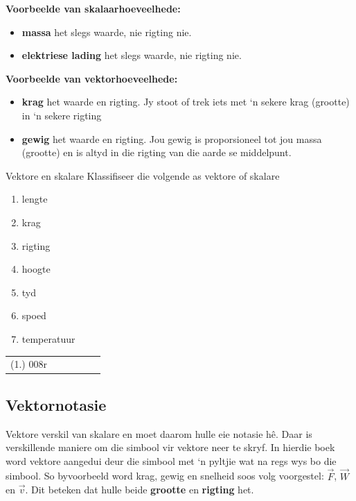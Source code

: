 \textbf{Voorbeelde van skalaarhoeveelhede:}
\begin{itemize}
\item \textbf{massa} het slegs waarde, nie rigting nie.
\item \textbf{elektriese lading} het slegs waarde, nie rigting nie.
\end{itemize}

\textbf{Voorbeelde van vektorhoeveelhede:} 
\begin{itemize}
\item \textbf{krag} het waarde en rigting. Jy stoot of trek iets met ‘n sekere krag (grootte) in ‘n sekere rigting
\item \textbf{gewig} het waarde en rigting. Jou gewig is proporsioneel tot jou massa (grootte) en is altyd in die rigting van die aarde se middelpunt.
\end{itemize}

\begin{exercises}{Vektore en skalare}\vspace{-1cm}
Klassifiseer die volgende as vektore of skalare
 \begin{enumerate}[noitemsep,label=\textbf{\arabic*}.]
\item lengte
\item krag
\item rigting
\item hoogte
\item tyd
\item spoed
\item temperatuur
 \end{enumerate}
\par \practiceinfo
 \par \begin{tabular}[h]{cccccc}
 (1.) 008r   \end{tabular}
\end{exercises}

    \label{m38812*cid4}
      \label{m38812*uid1}
\subsection*{Vektornotasie}
            \nopagebreak
Vektore verskil van skalare en moet daarom hulle eie notasie hê. Daar is verskillende maniere om die simbool vir vektore neer te skryf. In hierdie boek word vektore aangedui deur die simbool met ‘n pyltjie wat na regs wys bo die simbool. So byvoorbeeld word krag, gewig en snelheid soos volg voorgestel: $\stackrel{\to }{F}$, $\stackrel{\to }{W}$ en $\stackrel{\to }{v}$. Dit beteken dat hulle beide \textbf{grootte} en \textbf{rigting} het.

